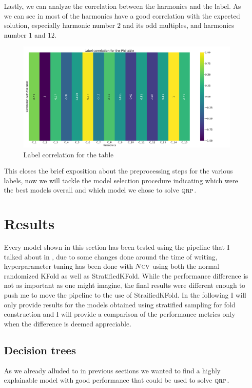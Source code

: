 Lastly, we can analyze the correlation between the harmonics and the label. As we can see in  most of the harmonics have a good correlation with the expected solution, especially harmonic number $2$ and its odd multiples, and harmonics number $1$ and $12$.
\begin{figure}[h!]
	\centering
	\includegraphics[width=\linewidth]{img/Phi_label_corr.png}
	\caption{Label correlation for the \phin table} \label{fig:phi-lcorr}
\end{figure}
This closes the brief exposition about the preprocessing steps for the various labels, now we will
tackle the model selection procedure indicating which were the best models overall and which model
we chose to solve $\textsc{qrp}$.

\section{Results}
Every model shown in this section has been tested using the pipeline that I talked about in
, due to some changes done around the time of writing, hyperparameter tuning has
been done with $N\textsc{cv}$ using both the normal randomized KFold as well as StratifiedKFold. While the
performance difference is not as important as one might imagine, the final results were different
enough to push me to move the pipeline to the use of StraifiedKFold. In the following I will only
provide results for the models obtained using stratified sampling for fold construction and I will
provide a comparison of the performance metrics only when the difference is deemed appreciable.

\subsection{Decision trees}
As we already alluded to in previous sections we wanted to find a highly explainable model with good
performance that could be used to solve $\textsc{qrp}$.

